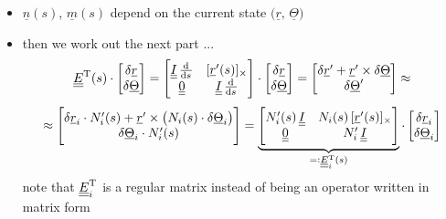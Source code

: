 \begin{frame}
  \begin{itemize}
    \item $\underline{n}(s)$, $\underline{m}(s)$ depend on the current state $\bigl( \underline{r}, \, \underline{\Theta} \bigr)$
    \item then we work out the next part ...
      \begin{displaymath}
        \doubleunderline{E}^{\mathrm{T}}(s) \cdot
        \begin{bmatrix}
          \delta \underline{r} \\ \delta \underline{\Theta}
        \end{bmatrix} =
        \begin{bmatrix}
          \doubleunderline{I} \, \od{}{s} & [ \underline{r}^{\prime}(s) ]_{\times} \\
          \doubleunderline{0}             & \doubleunderline{I} \, \od{}{s}
        \end{bmatrix} \cdot
        \begin{bmatrix}
          \delta \underline{r} \\ \delta \underline{\Theta}
        \end{bmatrix} =
        \begin{bmatrix}
          \delta \underline{r}^{\prime} + \underline{r}^{\prime} \times \delta \underline{\Theta} \\
          \delta \underline{\Theta}^{\prime}
        \end{bmatrix} \approx
      \end{displaymath}
      \begin{displaymath}
        \approx
        \begin{bmatrix}
          \delta \underline{r}_i \cdot N_i^{\prime}(s) + \underline{r}^{\prime} \times \left( N_i(s) \cdot \delta \underline{\Theta}_i \right) \\
          \delta \underline{\Theta}_i \cdot N_i^{\prime}(s)
        \end{bmatrix} =
        \underbrace{
        \begin{bmatrix}
          N_i^{\prime}(s) \, \underline{\underline{I}}  & N_i(s) \, [\underline{r}^{\prime}(s)]_{\times} \\
          \underline{\underline{0}}                     & N_i^{\prime} \, \underline{\underline{I}}
        \end{bmatrix} }_{=: \underline{\underline{E}}_i^{\mathrm{T}}(s)} \cdot
        \begin{bmatrix}
          \delta \underline{r}_i \\
          \delta \underline{\Theta}_i
        \end{bmatrix}
      \end{displaymath}
    note that $\underline{\underline{E}}_i^{\mathrm{T}}$ is a regular matrix instead of being an operator written in matrix form
  \end{itemize}
\end{frame}


